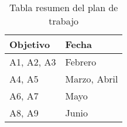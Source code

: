 \begin{table}[!ht]
\begin{center}
\begin{tabular}{|p{25mm}|p{50mm}|} \hline 
\textbf{Objetivo} & \textbf{Fecha} \\ \hline

A1, A2, A3 & Febrero \\
\hline

A4, A5 & Marzo, Abril 
\\
\hline

A6, A7 & Mayo
\\
\hline

A8, A9 & Junio
\\
\hline

\end{tabular}
\end{center}
\caption{Tabla resumen del plan de trabajo}
\label{table:resOthers}
\end{table}